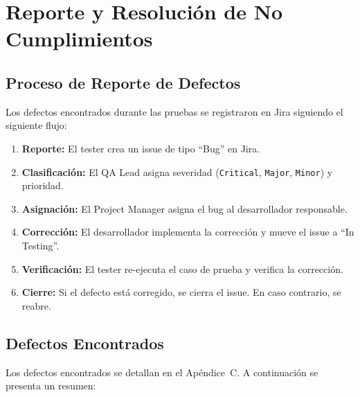 \chapter{Reporte y Resolución de No Cumplimientos}
\label{sec:reporte-resolucion}

\section{Proceso de Reporte de Defectos}
\label{sec:reporte-defectos}

Los defectos encontrados durante las pruebas se registraron en Jira siguiendo el siguiente flujo:

\begin{enumerate}
    \item \textbf{Reporte:} El tester crea un issue de tipo ``Bug'' en Jira.
    \item \textbf{Clasificación:} El QA Lead asigna severidad (\texttt{Critical}, \texttt{Major}, \texttt{Minor}) y prioridad.
    \item \textbf{Asignación:} El Project Manager asigna el bug al desarrollador responsable.
    \item \textbf{Corrección:} El desarrollador implementa la corrección y mueve el issue a ``In Testing''.
    \item \textbf{Verificación:} El tester re-ejecuta el caso de prueba y verifica la corrección.
    \item \textbf{Cierre:} Si el defecto está corregido, se cierra el issue. En caso contrario, se reabre.
\end{enumerate}

\section{Defectos Encontrados}
\label{sec:defectos-encontrados}

Los defectos encontrados se detallan en el Apéndice~C. A continuación se presenta un resumen:

